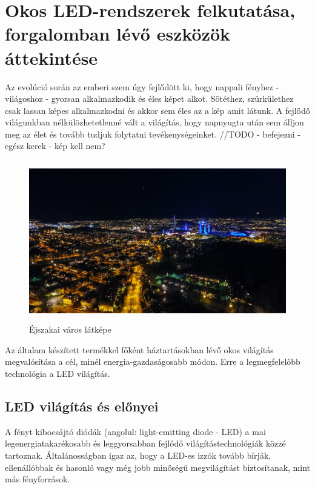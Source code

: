 \documentclass[../main.tex]{subfiles}
\begin{document}
\section{Okos LED-rendszerek felkutatása, forgalomban lévő eszközök áttekintése}
    Az evolúció során az emberi szem úgy fejlődött ki, hogy nappali fényhez - világoshoz - gyorsan alkalmazkodik és éles képet alkot. Sötéthez, szürkülethez csak lassan képes alkalmazkodni és akkor sem éles az a kép amit látunk. A fejlődő világunkban nélkülözhetetlenné vált a világítás, hogy napnyugta után sem álljon meg az élet és tovább tudjuk folytatni tevékenységeinket. //TODO - befejezni - egész kerek - kép kell nem?
    \begin{figure}[h!] %
        \centering
            \includegraphics[height=7cm]{irodalom_res/night_life.jpg}
        \caption{Éjszakai város látképe} %
    \end{figure}
    
    Az általam készített termékkel főként háztartásokban lévő okos világítás megvalósítása a cél, minél energia-gazdaságosabb módon. Erre a legmegfelelőbb technológia a LED világítás.
    
    \subsection{LED világítás és előnyei} %
    
    A fényt kibocsájtó diódák (angolul: light-emitting diode - LED) a mai legenergiatakarékosabb és leggyorsabban fejlődő világítástechnológiák közzé tartoznak. Általánosságban igaz az, hogy a LED-es izzók tovább bírják, ellenállóbbak és hasonló vagy még jobb minőségű megvilágítást biztosítanak, mint más fényforrások.
    
\end{document}
